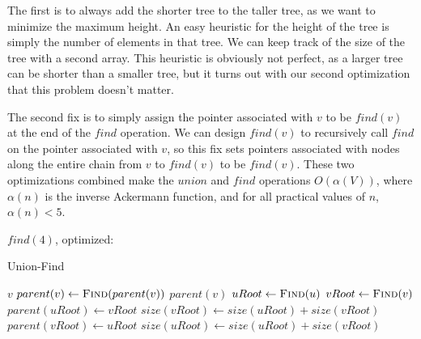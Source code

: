 The first is to always add the shorter tree to the taller tree, as we want to minimize the maximum height. An easy heuristic for the height of the tree is simply the number of elements in that tree. We can keep track of the size of the tree with a second array. This heuristic is obviously not perfect, as a larger tree can be shorter than a smaller tree, but it turns out with our second optimization that this problem doesn't matter.

The second fix is to simply assign the pointer associated with $v$ to be $find(v)$ at the end of the $find$ operation. We can design $find(v)$ to recursively call $find$ on the pointer associated with $v$, so this fix sets pointers associated with nodes along the entire chain from $v$ to $find(v)$ to be $find(v)$. These two optimizations combined make the $union$ and $find$ operations $O(\alpha (V))$, where $\alpha(n)$ is the inverse Ackermann function, and for all practical values of $n$, $\alpha(n) < 5$.

$find(4)$, optimized:

\begin{center}
\end{center}

\begin{algorithm}[H]
\caption{Union-Find}
\begin{algorithmic}
		\State \Return $v$
    \EndIf
    \State $parent(v) \gets \Call{Find}{parent(v)}$
    \State \Return $parent(v)$
\EndFunction
{}
	\State $uRoot \gets \Call{Find}{u}$
	\State $vRoot \gets \Call{Find}{v}$
		\State \Return
	\EndIf
    	\State $parent(uRoot) \gets vRoot$
        \State $size(vRoot) \gets size(uRoot) + size(vRoot)$
    \Else
    	\State $parent(vRoot) \gets uRoot$
        \State $size(uRoot) \gets size(uRoot) + size(vRoot)$
    \EndIf
\EndFunction
\end{algorithmic}
\end{algorithm}

